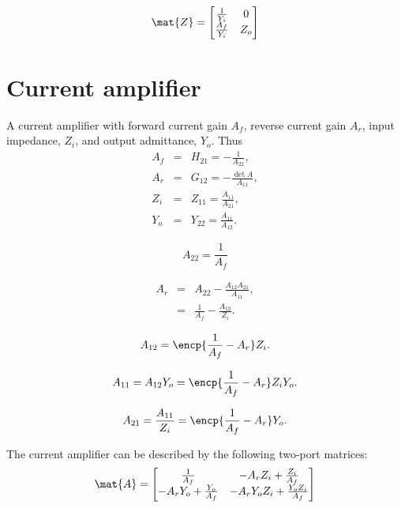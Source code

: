 \documentclass[a4paper, 12pt]{article}
\begin{document}
\begin{equation}
\mat{Z} = \left[\begin{matrix}\frac{1}{Y_{i}} & 0\\\frac{A_{f}}{Y_{i}} & Z_{o}\end{matrix}\right]
\end{equation}


\section{Current amplifier}

A current amplifier with forward current gain $A_f$, reverse current
gain $A_r$, input impedance, $Z_i$, and output admittance, $Y_o$.
Thus
%
\begin{eqnarray}
A_f & = &  H_{21} = -\frac{1}{A_{22}}, \\
A_r & = &  G_{12} = -\frac{\det{A}}{A_{11}}, \\
Z_i & = &  Z_{11} = \frac{A_{11}}{A_{21}}, \\
Y_o & = &  Y_{22} = \frac{A_{11}}{A_{12}}.
\end{eqnarray}

\begin{equation}
  A_{22} = \frac{1}{A_f}
\end{equation}

\begin{eqnarray}
  A_r & = & A_{22} - \frac{A_{12} A_{21}}{A_{11}}, \\
      & = & \frac{1}{A_f} - \frac{A_{12}}{Z_i}.
\end{eqnarray}

\begin{equation}
  A_{12} = \encp{\frac{1}{A_f} - A_r} Z_i.
\end{equation}

\begin{equation}
  A_{11} = A_{12} Y_o = \encp{\frac{1}{A_f} - A_r} Z_i Y_o.
\end{equation}

\begin{equation}
  A_{21} = \frac{A_{11}}{Z_i} = \encp{\frac{1}{A_f} - A_r} Y_o.
\end{equation}


The current amplifier can be described by the following two-port
matrices:
\begin{equation}
\mat{A} = \left[\begin{matrix}\frac{1}{A_{f}} & - A_{r} Z_{i} + \frac{Z_{i}}{A_{f}}\\- A_{r} Y_{o} + \frac{Y_{o}}{A_{f}} & - A_{r} Y_{o} Z_{i} + \frac{Y_{o} Z_{i}}{A_{f}}\end{matrix}\right]
\end{equation}
\end{document}

